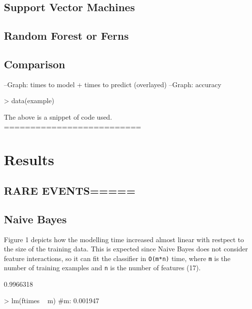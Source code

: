 \documentclass[a4paper]{article}
\begin{document}
\begin{multicols}{2}
\subsection*{Support Vector Machines}

\subsection*{Random Forest or Ferns}

\subsection*{Comparison}
--Graph: times to model + times to predict (overlayed)
--Graph: accuracy

\begin{Schunk}
\begin{Sinput}
> data(example)
\end{Sinput}
\end{Schunk}
The above is a snippet of code used. 
==========================


\section*{Results}

\subsection*{RARE EVENTS=====}

\subsection*{Naive Bayes}
Figure 1 depicts how the modelling time increased almost linear with restpect to the size of the training data. This is expected since Naive Bayes does not consider feature interactions, so it can fit the classifier in \texttt{O(m*n)} time, where \texttt{m} is the number of training examples and \texttt{n} is the number of features (17).
\begin{Schunk}
\begin{Soutput}
[1] 0.9966318

\end{Soutput}
\begin{Sinput}
> lm(ftimes ~ m) #m: 0.001947
\end{Sinput}
\begin{Soutput}


\end{Soutput}
\end{Schunk}
\end{multicols}
\end{document}
